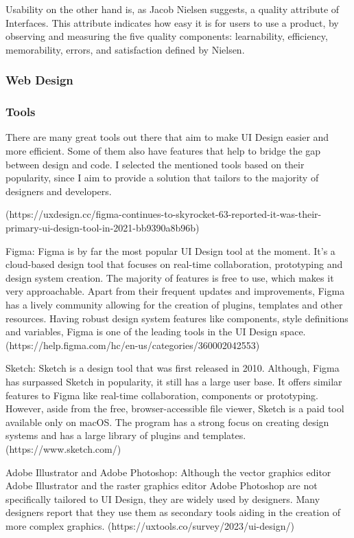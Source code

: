 Usability on the other hand is, as Jacob Nielsen suggests, a quality attribute of Interfaces. This
attribute indicates how easy it is for users to use a product, by observing and measuring the five
quality components: learnability, efficiency, memorability, errors, and satisfaction
defined by Nielsen. 

\subsubsection{Web Design}

\subsubsection{Tools}
There are many great tools out there that aim to make UI Design easier and more efficient. Some of
them also have features that help to bridge the gap between design and code. I selected the
mentioned tools based on their popularity, since I aim to provide a solution that tailors to the
majority of designers and developers.

(https://uxdesign.cc/figma-continues-to-skyrocket-63-reported-it-was-their-primary-ui-design-tool-in-2021-bb9390a8b96b)

Figma: Figma is by far the most popular UI Design tool at the moment. It's a cloud-based design tool
that focuses on real-time collaboration, prototyping and design system creation. The majority of
features is free to use, which makes it very approachable. Apart from their frequent updates and
improvements, Figma has a lively community allowing for the creation of plugins, templates and other
resources. Having robust design system features like components, style definitions and variables,
Figma is one of the leading tools in the UI Design space.
(https://help.figma.com/hc/en-us/categories/360002042553)

Sketch: Sketch is a design tool that was first released in 2010. Although, Figma has surpassed
Sketch in popularity, it still has a large user base. It offers similar features to Figma like
real-time collaboration, components or prototyping. However, aside from the free, browser-accessible
file viewer, Sketch is a paid tool available only on macOS. The program has a strong focus on
creating design systems and has a large library of plugins and templates. (https://www.sketch.com/)

Adobe Illustrator and Adobe Photoshop: Although the vector graphics editor Adobe Illustrator and the
raster graphics editor Adobe Photoshop are not specifically tailored to UI Design, they are widely
used by designers. Many designers report that they use them as secondary tools aiding in the
creation of more complex graphics. (https://uxtools.co/survey/2023/ui-design/)

